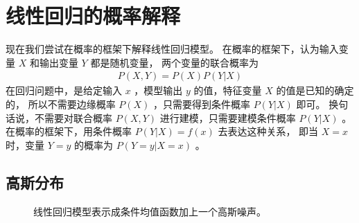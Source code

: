 \documentclass[letterpaper,10pt,english]{sphinxmanual}
\begin{document}
\section{线性回归的概率解释}
\label{\detokenize{_u7ebf_u6027_u56de_u5f52/content:id5}}
现在我们尝试在概率的框架下解释线性回归模型。
在概率的框架下，认为输入变量 \(X\) 和输出变量 \(Y\) 都是随机变量，
两个变量的联合概率为
\begin{equation}\label{equation:线性回归/content:线性回归/content:6}
\begin{split}P(X,Y)=P(X)P(Y|X)\end{split}
\end{equation}
在回归问题中，是给定输入 \(x\) ，模型输出 \(y\) 的值，特征变量 \(X\) 的值是已知的确定的，
所以不需要边缘概率 \(P(X)\) ，只需要得到条件概率 \(P(Y|X)\) 即可。
换句话说，不需要对联合概率 \(P(X,Y)\) 进行建模，只需要建模条件概率 \(P(Y|X)\)
。在概率的框架下，用条件概率 \(P(Y|X)=f(x)\) 去表达这种关系，
即当 \(X=x\) 时，变量 \(Y=y\) 的概率为 \(P(Y=y|X=x)\) 。


\subsection{高斯分布}
\label{\detokenize{_u7ebf_u6027_u56de_u5f52/content:id6}}
\begin{figure}[htbp]
\centering
\capstart

\noindent{}
\caption{线性回归模型表示成条件均值函数加上一个高斯噪声。}\label{\detokenize{_u7ebf_u6027_u56de_u5f52/content:id10}}\label{\detokenize{_u7ebf_u6027_u56de_u5f52/content:fg-29-12}}\end{figure}
\end{document}
